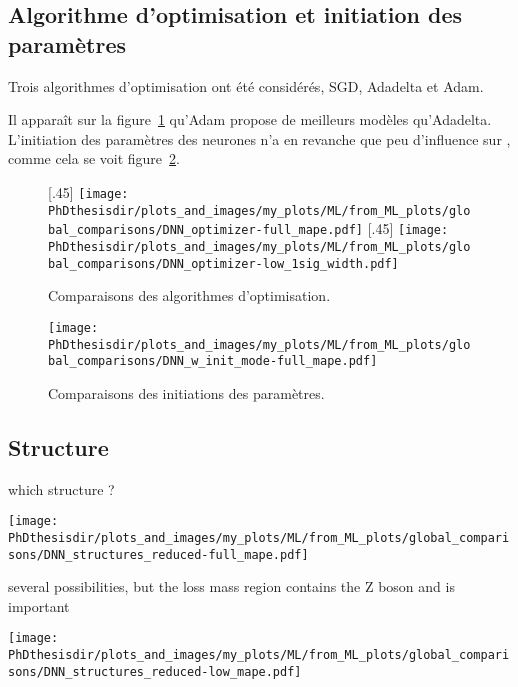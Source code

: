 \subsection{Algorithme d'optimisation et initiation des paramètres}
Trois algorithmes d'optimisation ont été considérés, SGD, Adadelta et Adam.


Il apparaît sur la figure~\ref{fig-optimizer} qu'Adam propose de meilleurs modèles qu'Adadelta.
L'initiation des paramètres des neurones n'a en revanche que peu d'influence sur \LossMAPE, comme cela se voit figure~\ref{fig-w_init_mode}.
\begin{figure}[h]
\centering

\subcaptionbox{}[.45\textwidth]
{\texttt{[image: \\PhDthesisdir/plots\_and\_images/my\_plots/ML/from\_ML\_plots/global\_comparisons/DNN\_optimizer-full\_mape.pdf]}\vspace{-\baselineskip}}
\hfill
\subcaptionbox{}[.45\textwidth]
{\texttt{[image: \\PhDthesisdir/plots\_and\_images/my\_plots/ML/from\_ML\_plots/global\_comparisons/DNN\_optimizer-low\_1sig\_width.pdf]}\vspace{-\baselineskip}}
\caption{Comparaisons des algorithmes d'optimisation.}
\label{fig-optimizer}
\end{figure}
\begin{figure}[h]
\centering
\texttt{[image: \\PhDthesisdir/plots\_and\_images/my\_plots/ML/from\_ML\_plots/global\_comparisons/DNN\_w\_init\_mode-full\_mape.pdf]}
\caption{Comparaisons des initiations des paramètres.}
\label{fig-w_init_mode}
\end{figure}
\subsection{Structure}
which structure ?

\texttt{[image: \\PhDthesisdir/plots\_and\_images/my\_plots/ML/from\_ML\_plots/global\_comparisons/DNN\_structures\_reduced-full\_mape.pdf]}

several possibilities, but the loss mass region contains the Z boson and is important

\texttt{[image: \\PhDthesisdir/plots\_and\_images/my\_plots/ML/from\_ML\_plots/global\_comparisons/DNN\_structures\_reduced-low\_mape.pdf]}

